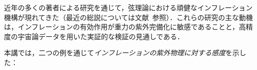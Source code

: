 




\newpage
{}

\begingroup
\setlength{\abovedisplayskip}{5pt}
\setlength{\belowdisplayskip}{5pt}
\setlength{\abovedisplayshortskip}{3pt}
\setlength{\belowdisplayshortskip}{3pt}
近年の多くの著者による研究を通じて，弦理論における頑健なインフレーション機構が現れてきた（最近の総説については文献~\cite{BMReview, Burgess:2007pz, Kallosh:2007ig, Linde:2005dd, McAllister:2007bg, Cline:2006hu}参照）．これらの研究の主な動機は，インフレーションの有効作用が重力の紫外完備化に敏感であることと，高精度の宇宙論データを用いた実証的な検証の見通しである．

本講では，二つの例を通じて{\it インフレーションの紫外物理に対する感度}を示した：

